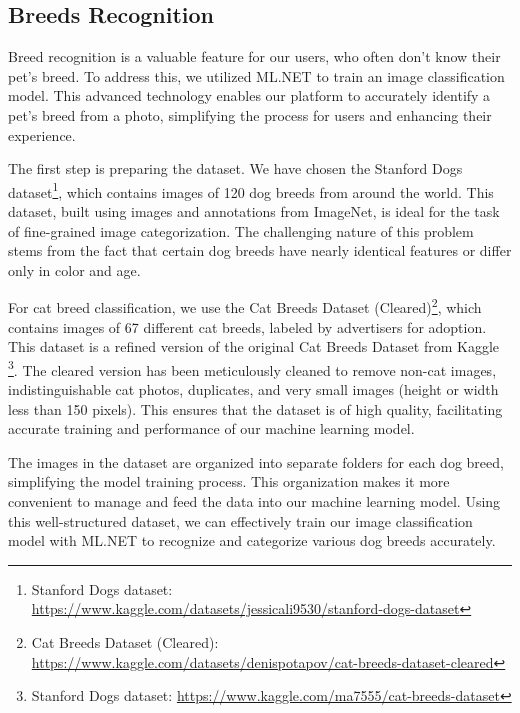 \subsection{Breeds Recognition}
Breed recognition is a valuable feature for our users, who often don't know their pet's breed. To address this, we utilized ML.NET 
to train an image classification model. This advanced technology enables our platform to accurately identify a pet's breed from a photo, 
simplifying the process for users and enhancing their experience.

The first step is preparing the dataset. We have chosen the Stanford Dogs dataset\footnote{Stanford Dogs dataset: \url{https://www.kaggle.com/datasets/jessicali9530/stanford-dogs-dataset}}, which contains images of 120 dog breeds from around 
the world. This dataset, built using images and annotations from ImageNet, is ideal for the task of fine-grained image categorization. 
The challenging nature of this problem stems from the fact that certain dog breeds have nearly identical features or differ only in color and age.

For cat breed classification, we use the Cat Breeds Dataset (Cleared)\footnote{Cat Breeds Dataset (Cleared): \url{https://www.kaggle.com/datasets/denispotapov/cat-breeds-dataset-cleared}}, which contains images of 67 different cat breeds, labeled by advertisers for 
adoption. This dataset is a refined version of the original Cat Breeds Dataset from Kaggle \footnote{Stanford Dogs dataset: \url{https://www.kaggle.com/ma7555/cat-breeds-dataset}}. 
The cleared version has been meticulously cleaned to remove non-cat images, indistinguishable cat photos, duplicates, and very small images 
(height or width less than 150 pixels). This ensures that the dataset is of high quality, facilitating accurate training and performance of our 
machine learning model.

The images in the dataset are organized into separate folders for each dog breed, simplifying the model training process. This organization 
makes it more convenient to manage and feed the data into our machine learning model. Using this well-structured dataset, we can effectively 
train our image classification model with ML.NET to recognize and categorize various dog breeds accurately.

